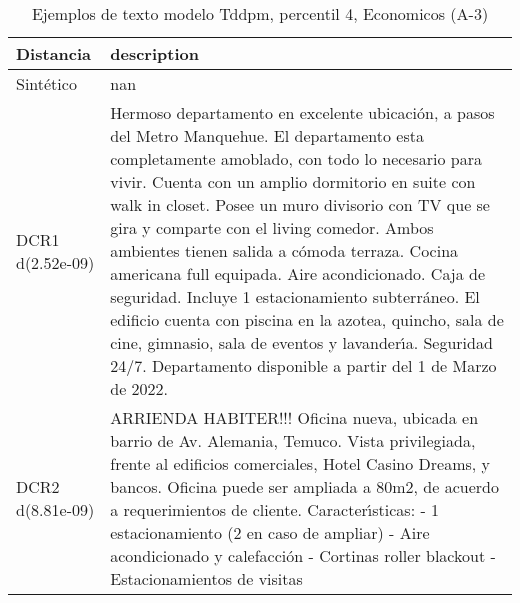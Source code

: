 \begin{table}[H]
\centering
\fontsize{10}{14}\selectfont
\caption{Ejemplos de texto modelo Tddpm, percentil 4, Economicos (A-3)}
\label{table-example-economicos-a-3-tddpm_mlp-4p-text}
\begin{tabular}{|l|m{35em}|}
\hline
\rowcolor[gray]{0.8}
Distancia & description \\
\hline Sintético & nan \\
\hline DCR1 d(2.52e-09) & Hermoso departamento en excelente ubicaci\'on, a pasos del Metro Manquehue.   El departamento esta completamente amoblado, con todo lo necesario para vivir. Cuenta con un amplio dormitorio en suite con walk in closet. Posee un muro divisorio con TV que se gira y comparte con el living comedor. Ambos ambientes tienen salida a c\'omoda terraza. Cocina americana full equipada. Aire acondicionado. Caja de seguridad.   Incluye 1 estacionamiento subterr\'aneo. El edificio cuenta con piscina en la azotea, quincho, sala de cine, gimnasio, sala de eventos y lavander{\'\i}a. Seguridad 24/7.  Departamento disponible a partir del 1 de Marzo de 2022. \\
\hline DCR2 d(8.81e-09) & ARRIENDA HABITER!!!  Oficina nueva, ubicada en barrio de Av. Alemania, Temuco.  Vista privilegiada, frente al edificios comerciales, Hotel Casino Dreams, y bancos.  Oficina puede ser ampliada a 80m2, de acuerdo a requerimientos de cliente.  Caracter{\'\i}sticas: - 1 estacionamiento (2 en caso de ampliar) - Aire acondicionado y calefacci\'on - Cortinas roller blackout - Estacionamientos de visitas \\
\hline
\end{tabular}
\end{table}

